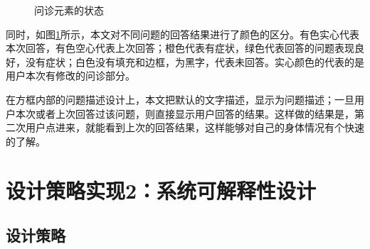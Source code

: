 \begin{figure}[h]
    \centering
    \caption{问诊元素的状态}
    \label{fig:question_status}
\end{figure}

同时，如图\ref{fig:question_status}所示，本文对不同问题的回答结果进行了颜色的区分。有色实心代表本次回答，有色空心代表上次回答；橙色代表有症状，绿色代表回答的问题表现良好，没有症状；白色没有填充和边框，为黑字，代表未回答。实心颜色的代表的是用户本次有修改的问诊部分。

在方框内部的问题描述设计上，本文把默认的文字描述，显示为问题描述；一旦用户本次或者上次回答过该问题，则直接显示用户回答的结果。这样做的结果是，第二次用户点进来，就能看到上次的回答结果，这样能够对自己的身体情况有个快速的了解。

\section{设计策略实现2：系统可解释性设计}

\subsection{设计策略}

